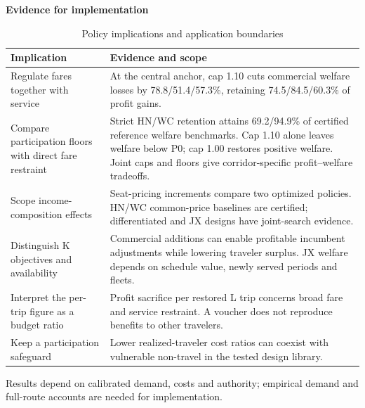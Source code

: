 \begin{table}[htbp]\centering
\caption{Policy implications and application boundaries}\label{tab:key_findings}
\begin{minipage}{.95\textwidth}\fontsize{8}{10}\selectfont{}\setlength{\tabcolsep}{2pt}\renewcommand{\arraystretch}{1.08}
\par\noindent\textbf{Evidence for implementation}\par\smallskip
\begin{tabular*}{\linewidth}{@{\extracolsep{\fill}}>{\raggedright\arraybackslash}p{.32\linewidth}>{\raggedright\arraybackslash}p{.62\linewidth}@{}}\toprule
Implication & Evidence and scope \\
\midrule
Regulate fares together with service & At the central anchor, cap 1.10 cuts commercial welfare losses by 78.8/51.4/57.3\%, retaining 74.5/84.5/60.3\% of profit gains. \\
Compare participation floors with direct fare restraint & Strict HN/WC retention attains 69.2/94.9\% of certified reference welfare benchmarks. Cap 1.10 alone leaves welfare below P0; cap 1.00 restores positive welfare. Joint caps and floors give corridor-specific profit--welfare tradeoffs. \\
Scope income-composition effects & Seat-pricing increments compare two optimized policies. HN/WC common-price baselines are certified; differentiated and JX designs have joint-search evidence. \\
Distinguish K objectives and availability & Commercial additions can enable profitable incumbent adjustments while lowering traveler surplus. JX welfare depends on schedule value, newly served periods and fleets. \\
Interpret the per-trip figure as a budget ratio & Profit sacrifice per restored L trip concerns broad fare and service restraint. A voucher does not reproduce benefits to other travelers. \\
Keep a participation safeguard & Lower realized-traveler cost ratios can coexist with vulnerable non-travel in the tested design library. \\
\bottomrule\end{tabular*}\par\medskip
\par\noindent\fontsize{8}{9.5}\selectfont Results depend on calibrated demand, costs and authority; empirical demand and full-route accounts are needed for implementation.
\end{minipage}\end{table}
